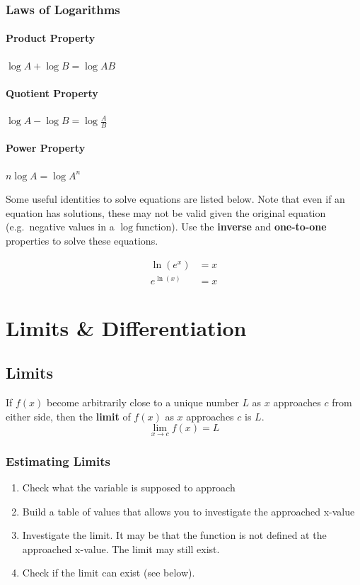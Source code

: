 \subsubsection{Laws of Logarithms}
\paragraph{Product Property} \(\log A + \log B = \log AB\)
\paragraph{Quotient Property} \(\log A - \log B = \log \frac{A}{B}\)
\paragraph{Power Property} \(n \log A  = \log A^n\)

Some useful identities to solve equations are listed below. Note that even if an equation has solutions, these may not be valid given the original equation (e.g.\ negative values in a \(\log \)function). Use the \textbf{inverse} and \textbf{one-to-one} properties to solve these equations.

\begin{align}
	\ln(e^x)   & = x \\
	e^{\ln(x)} & = x
\end{align}

\section{Limits \& Differentiation}

\subsection{Limits}
If \(f(x)\) become arbitrarily close to a unique number \(L\) as \(x\) approaches \(c\) from either side, then the \textbf{limit} of \(f(x)\) as \(x\) approaches \(c\) is \(L\).
\begin{equation}
	\lim_{x \to c}f(x) = L
\end{equation}

\subsubsection{Estimating Limits}
\begin{enumerate}
	\item Check what the variable is supposed to approach
	\item Build a table of values that allows you to investigate the approached x-value
	\item Investigate the limit. It may be that the function is not defined at the approached x-value. The limit may still exist.
	\item Check if the limit can exist (see below).
\end{enumerate}

